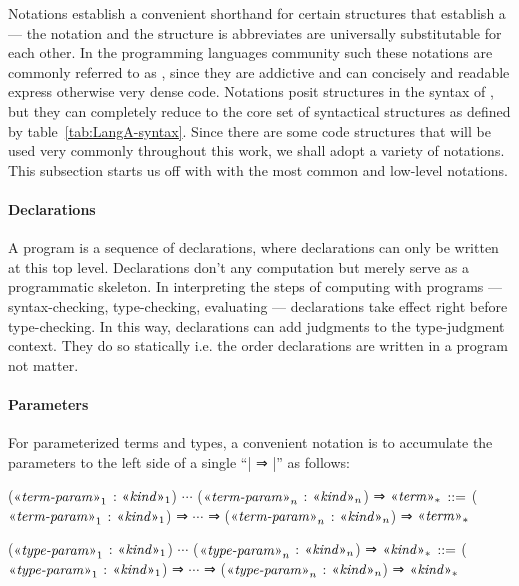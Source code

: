 
Notations establish a convenient shorthand for certain structures that establish a  --- the notation and the structure is abbreviates are universally substitutable for each other.
In the programming languages community such these notations are commonly referred to as , since they are addictive and can concisely and readable express otherwise very dense code.
Notations posit  structures in the syntax of \LangA, but they can completely reduce to the core set of syntactical structures as defined by table~\ref{tab:LangA-syntax}.
Since there are some code structures that will be used very commonly throughout this work, we shall adopt a variety of notations.
This subsection starts us off with with the most common and low-level notations.


\paragraph{Declarations}

A \LangA program is a sequence of declarations, where declarations can only be written at this top level.
Declarations don't  any computation but merely serve as a programmatic skeleton.
In interpreting the steps of computing \LangA with programs --- syntax-checking, type-checking, evaluating --- declarations take effect right before type-checking.
In this way, declarations can add judgments to the type-judgment context.
They do so statically i.e. the order declarations are written in a program not matter.

\paragraph{Parameters}
For parameterized terms and types, a convenient notation is to accumulate the parameters to the left side of a single ``\code| ⇒ |'' as follows:
\begin{notational}[caption={Notation for multiple parameters}]
($\mvar{term-param}_1$ : $\mvar{kind}_1$) $\cdots$ ($\mvar{term-param}_n$ : $\mvar{kind}_n$) ⇒ $\mvar{term}_*$
  $\syneq$
    ($\mvar{term-param}_1$ : $\mvar{kind}_1$) ⇒ $\cdots$ ⇒ ($\mvar{term-param}_n$ : $\mvar{kind}_n$) ⇒ $\mvar{term}_*$

($\mvar{type-param}_1$ : $\mvar{kind}_1$) $\cdots$ ($\mvar{type-param}_n$ : $\mvar{kind}_n$) ⇒ $\mvar{kind}_*$
  $\syneq$
    ($\mvar{type-param}_1$ : $\mvar{kind}_1$) ⇒ $\cdots$ ⇒ ($\mvar{type-param}_n$ : $\mvar{kind}_n$) ⇒ $\mvar{kind}_*$
\end{notational}

